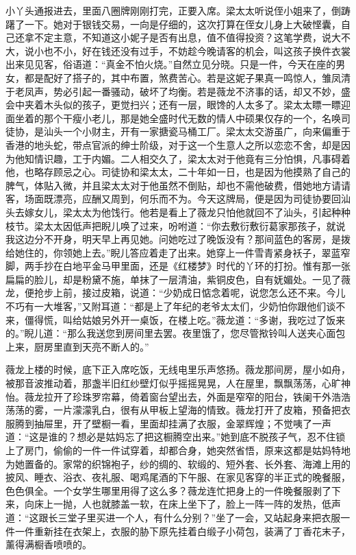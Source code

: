 \par 小丫头通报进去，里面八圈牌刚刚打完，正要入席。梁太太听说侄小姐来了，倒踌躇了一下。她对于银钱交易，一向是仔细的，这次打算在侄女儿身上大破悭囊，自己还拿不定主意，不知道这小妮子是否有出息，值不值得投资？这笔学费，说大不大，说小也不小，好在钱还没有过手，不妨趁今晚请客的机会，叫这孩子换件衣裳出来见见客，俗语道：“真金不怕火烧。”自然立见分晓。只是一件，今天在座的男女，都是配好了搭子的，其中布置，煞费苦心。若是这妮子果真一鸣惊人，雏凤清于老凤声，势必引起一番骚动，破坏了均衡。若是薇龙不济事的话，却又不妙，盛会中夹着木头似的孩子，更觉扫兴；还有一层，眼馋的人太多了。梁太太瞟一瞟迎面坐着的那个干瘦小老儿，那是她全盛时代无数的情人中硕果仅存的一个，名唤司徒协，是汕头一个小财主，开有一家搪瓷马桶工厂。梁太太交游虽广，向来偏重于香港的地头蛇，带点官派的绅士阶级，对于这一个生意人之所以恋恋不舍，却是因为他知情识趣，工于内媚。二人相交久了，梁太太对于他竟有三分怕惧，凡事碍着他，也略存顾忌之心。司徒协和梁太太，二十年如一日，也是因为他摸熟了自己的脾气，体贴入微，并且梁太太对于他虽然不倒贴，却也不需他破费，借她地方请请客，场面既漂亮，应酬又周到，何乐而不为。今天这牌局，便是因为司徒协要回汕头去嫁女儿，梁太太为他饯行。他若是看上了薇龙只怕他就回不了汕头，引起种种枝节。梁太太因低声把睨儿唤了过来，吩咐道：“你去敷衍敷衍葛家那孩子，就说我这边分不开身，明天早上再见她。问她吃过了晚饭没有？那间蓝色的客房，是拨给她住的，你领她上去。”睨儿答应着走了出来。她穿上一件雪青紧身袄子，翠蓝窄脚，两手抄在白地平金马甲里面，还是《红楼梦》时代的丫环的打扮。惟有那一张扁扁的脸儿，却是粉黛不施，单抹了一层清油，紫铜皮色，自有妩媚处。一见了薇龙，便抢步上前，接过皮箱，说道：“少奶成日惦念着呢，说您怎么还不来。今儿不巧有一大堆客，”又附耳道：“都是上了年纪的老爷太太们，少奶怕你跟他们谈不来，僵得慌，叫给姑娘另外开一桌饭，在楼上吃。”薇龙道：“多谢，我吃过了饭来的。”睨儿道：“那么我送您到房间里去罢。夜里饿了，您尽管揿铃叫人送夹心面包上来，厨房里直到天亮不断人的。”
\par 薇龙上楼的时候，底下正入席吃饭，无线电里乐声悠扬。薇龙那间房，屋小如舟，被那音波推动着，那盏半旧红纱壁灯似乎摇摇晃晃，人在屋里，飘飘荡荡，心旷神怡。薇龙拉开了珍珠罗帘幕，倚着窗台望出去，外面是窄窄的阳台，铁阑干外浩浩荡荡的雾，一片濛濛乳白，很有从甲板上望海的情致。薇龙打开了皮箱，预备把衣服腾到抽屉里，开了壁橱一看，里面却挂满了衣服，金翠辉煌；不觉咦了一声道：“这是谁的？想必是姑妈忘了把这橱腾空出来。”她到底不脱孩子气，忍不住锁上了房门，偷偷的一件一件试穿着，却都合身，她突然省悟，原来这都是姑妈特地为她置备的。家常的织锦袍子，纱的绸的、软缎的、短外套、长外套、海滩上用的披风、睡衣、浴衣、夜礼服、喝鸡尾酒的下午服、在家见客穿的半正式的晚餐服，色色俱全。一个女学生哪里用得了这么多？薇龙连忙把身上的一件晚餐服剥了下来，向床上一抛，人也就膝盖一软，在床上坐下了，脸上一阵一阵的发热，低声道：“这跟长三堂子里买进一个人，有什么分别？”坐了一会，又站起身来把衣服一件一件重新挂在衣架上，衣服的胁下原先挂着白缎子小荷包，装满了丁香花末子，薰得满橱香喷喷的。
